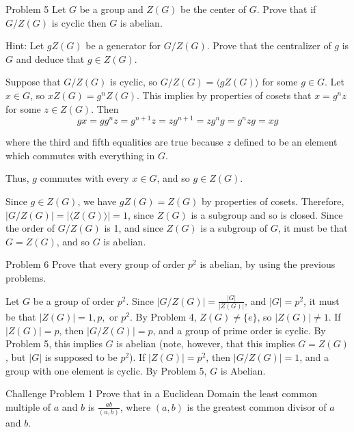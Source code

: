 \documentclass{hmwk}
\begin{document}
\begin{problem}{Problem 5}
Let $G$ be a group and $Z(G)$ be the center of $G$. Prove that if $G/Z(G)$ is cyclic then $G$ is abelian.

\noindent Hint: Let $gZ(G)$ be a generator for $G/Z(G)$. Prove that the centralizer of $g$ is $G$ and
deduce that $g \in Z(G)$.
\end{problem}

\begin{solution}

\pre Suppose that $G/Z(G)$ is cyclic, so $G/Z(G) = \langle gZ(G) \rangle$ for some $g \in G$. Let $x \in G$, so $xZ(G) = g^nZ(G)$. This implies by properties of cosets that $x = g^nz$ for some $z \in Z(G)$. Then $$gx = gg^nz = g^{n+1}z = zg^{n+1} = zg^ng = g^nzg = xg$$

\pre where the third and fifth equalities are true because $z$ defined to be an element which commutes with everything in $G$. 

\pre Thus, $g$ commutes with every $x \in G$, and so $g \in Z(G)$. 

\pre Since $g \in Z(G)$, we have $gZ(G) = Z(G)$ by properties of cosets. Therefore, $|G/Z(G)| = |\langle Z(G) \rangle | = 1$, since $Z(G)$ is a subgroup and so is closed. Since the order of $G/Z(G)$ is 1, and since $Z(G)$ is a subgroup of $G$, it must be that $G = Z(G)$, and so $G$ is abelian.
\end{solution}

\begin{problem}{Problem 6}
Prove that every group of order $p^2$ is abelian, by using the previous problems.
\end{problem}

\begin{solution}

\pre Let $G$ be a group of order $p^2$. Since $|G/Z(G)| = \frac{|G|}{|Z(G)|}$, and $|G| = p^2$, it must be that $|Z(G)| = 1, p, \text{ or } p^2$. By Problem 4, $Z(G) \neq \{e\}$, so $|Z(G)| \neq 1$. If $|Z(G)| = p$, then $|G/Z(G)| = p$, and a group of prime order is cyclic. By Problem 5, this implies $G$ is abelian (note, however, that this implies $G = Z(G)$, but $|G|$ is supposed to be $p^2$). If $|Z(G)| = p^2$, then $|G/Z(G)| = 1$, and a group with one element is cyclic. By Problem 5, $G$ is Abelian. 
\end{solution}

\begin{problem}{Challenge Problem 1}
Prove that in a Euclidean Domain the least common multiple of $a$ and $b$ is $\frac{ab}{(a,b)}$, where $(a, b)$ is the greatest common divisor of $a$ and $b$.
\end{problem}
\end{document}
